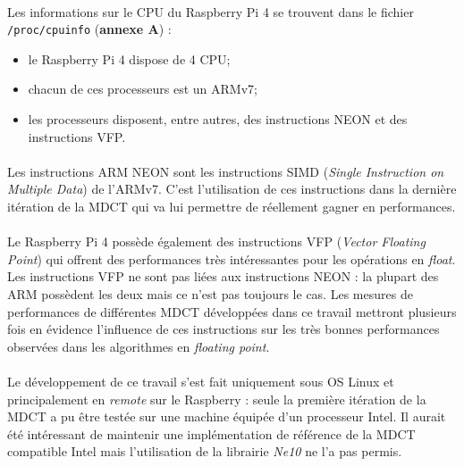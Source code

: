 \documentclass{article}
\begin{document}
    \paragraph{}
    Les informations sur le CPU du Raspberry Pi 4 se trouvent dans le fichier \texttt{/proc/cpuinfo} (\textbf{annexe A}) :
    \begin{itemize}
        \item le Raspberry Pi 4 dispose de 4 CPU;
        \item chacun de ces processeurs est un ARMv7;
        \item les processeurs disposent, entre autres, des instructions NEON et des instructions VFP.
    \end{itemize}

    \paragraph{}
    Les instructions ARM NEON sont les instructions SIMD (\emph{Single Instruction on Multiple Data}) de l'ARMv7. C'est l'utilisation de ces instructions dans la dernière itération de la MDCT qui va lui permettre de réellement gagner en performances.

    \paragraph{}
    Le Raspberry Pi 4 possède également des instructions VFP (\emph{Vector Floating Point}) qui offrent des performances très intéressantes pour les opérations en \emph{float}. Les instructions VFP ne sont pas liées aux instructions NEON : la plupart des ARM possèdent les deux mais ce n'est pas toujours le cas. Les mesures de performances de différentes MDCT développées dans ce travail mettront plusieurs fois en évidence l'influence de ces instructions sur les très bonnes performances observées dans les algorithmes en \emph{floating point}.

    \paragraph{}
    Le développement de ce travail s'est fait uniquement sous OS Linux et principalement en \emph{remote} sur le Raspberry : seule la première itération de la MDCT a pu être testée sur une machine équipée d'un processeur Intel. Il aurait été intéressant de maintenir une implémentation de référence de la MDCT compatible Intel mais l'utilisation de la librairie \emph{Ne10} ne l'a pas permis.
\end{document}
